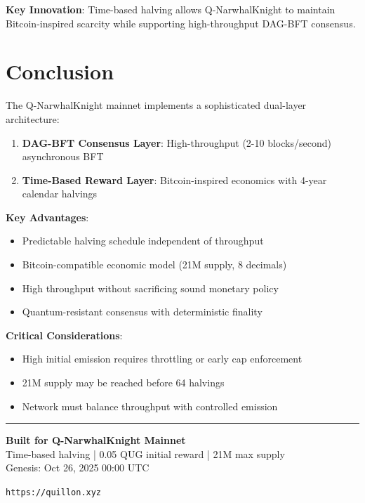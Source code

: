 \documentclass[11pt,a4paper]{article}
\begin{document}
\textbf{Key Innovation}: Time-based halving allows Q-NarwhalKnight to maintain Bitcoin-inspired scarcity while supporting high-throughput DAG-BFT consensus.

\section{Conclusion}

The Q-NarwhalKnight mainnet implements a sophisticated dual-layer architecture:

\begin{enumerate}
    \item \textbf{DAG-BFT Consensus Layer}: High-throughput (2-10 blocks/second) asynchronous BFT
    \item \textbf{Time-Based Reward Layer}: Bitcoin-inspired economics with 4-year calendar halvings
\end{enumerate}

\textbf{Key Advantages}:
\begin{itemize}
    \item Predictable halving schedule independent of throughput
    \item Bitcoin-compatible economic model (21M supply, 8 decimals)
    \item High throughput without sacrificing sound monetary policy
    \item Quantum-resistant consensus with deterministic finality
\end{itemize}

\textbf{Critical Considerations}:
\begin{itemize}
    \item High initial emission requires throttling or early cap enforcement
    \item 21M supply may be reached before 64 halvings
    \item Network must balance throughput with controlled emission
\end{itemize}

\vfill

\begin{center}
\rule{0.8\textwidth}{0.4pt}

\textbf{Built for Q-NarwhalKnight Mainnet} \\
\vspace{0.2cm}
\small Time-based halving | 0.05 QUG initial reward | 21M max supply \\
Genesis: Oct 26, 2025 00:00 UTC

\vspace{0.3cm}
\texttt{https://quillon.xyz}
\end{center}
\end{document}
